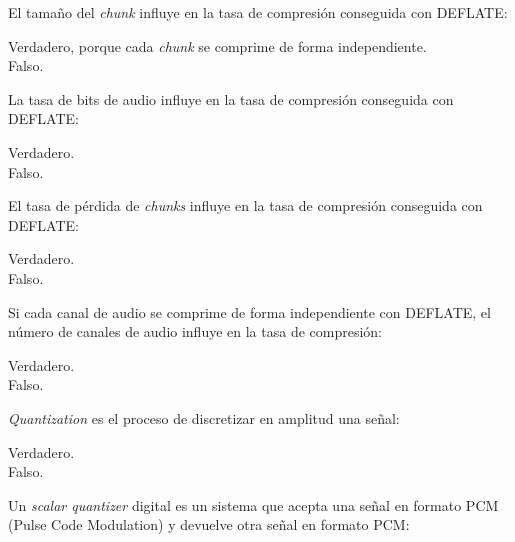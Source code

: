 \documentclass[legalpaper, 12pt, addpoints]{exam}
\begin{document}
\begin{questions}
\question El tamaño del \emph{chunk} influye en la tasa de compresión
conseguida con DEFLATE:

\begin{oneparchoices}
  \choice Verdadero, porque cada \emph{chunk} se comprime de forma independiente.\\
  \choice Falso.
\end{oneparchoices}
  
\vspace{0.10in}

\question La tasa de bits de audio influye en la tasa de compresión
conseguida con DEFLATE:

\begin{oneparchoices}
  \choice Verdadero.\\
  \choice Falso.
\end{oneparchoices}
  
\vspace{0.10in}

\question El tasa de pérdida de \emph{chunks} influye en la tasa de
compresión conseguida con DEFLATE:

\begin{oneparchoices}
  \choice Verdadero.\\
  \choice Falso.
\end{oneparchoices}
  
\vspace{0.10in}

\question Si cada canal de audio se comprime de forma independiente
con DEFLATE, el número de canales de audio influye en la tasa de
compresión:

\begin{oneparchoices}
  \choice Verdadero.\\
  \choice Falso.
\end{oneparchoices}
  
\vspace{0.10in}

\question \emph{Quantization} es el proceso de discretizar en amplitud una señal:

\begin{oneparchoices}
  \choice Verdadero.\\
  \choice Falso.
\end{oneparchoices}
  
\vspace{0.10in}

\question Un \emph{scalar quantizer} digital es un sistema que acepta
una señal en formato PCM (Pulse Code Modulation) y devuelve otra señal
en formato PCM:


\end{questions}
\end{document}
